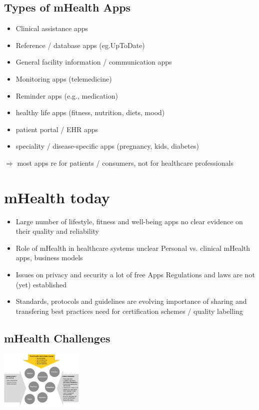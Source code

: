 \documentclass{report}
\newenvironment{Figure}
	{\par\medskip\noindent\minipage{\linewidth}}
	{\endminipage\par\medskip}
\theoremstyle{definition}
\theoremstyle{example}
\begin{document}
\subsection{Types of mHealth Apps}
\begin{itemize}
   \item Clinical assistance apps
   \item Reference / database apps (eg.UpToDate)
   \item General facility information / communication apps
   \item Monitoring apps (telemedicine)
   \item Reminder apps (e.g., medication)
   \item healthy life apps (fitness, nutrition, diets, mood)
   \item patient portal / EHR apps
   \item speciality / disease-specific apps (pregnancy, kids, diabetes)
\end{itemize}

$\Rightarrow$ most apps re for patients / consumers, not for healthcare professionals

\section{mHealth today}
\begin{itemize}
   \item Large number of lifestyle, fitness and well-being apps
   \subitem no clear evidence on their quality and reliability 
   \item Role of mHealth in healthcare systems unclear
   \subitem Personal vs. clinical mHealth apps, business models 
   \item Issues on privacy and security
   \subitem a lot of free Apps
   \subitem Regulations and laws are not (yet) established 
   \item Standards, protocols and guidelines are evolving
   \subitem importance of sharing and transfering best practices 
   \subitem need for certification schemes / quality labelling 
\end{itemize}

\subsection{mHealth Challenges}
\begin{Figure}
   \centering
    \includegraphics[width=150px]{img/mHealthChallenges.png}
        \label{fig:eHealth and mHealth Challenges today}
\end{Figure}
\end{document}
